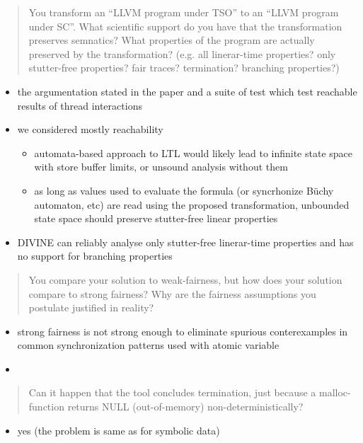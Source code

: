 \documentclass[aspectratio=169, fi]{paradise-slide}
\newcommand{\rquote}[1]{\begin{quote}#1\end{quote}\bigskip\setlength{\leftmargini}{1em}}
\begin{document}
\begin{frame}[noframenumbering]{\qtitle}
  \rquote{You transform an ``LLVM program under TSO'' to an ``LLVM program under SC''. What
  scientific support do you have that the transformation preserves semnatics? What properties of the
  program are actually preserved by the transformation? (e.g. all linerar-time properties? only
  stutter-free properties? fair traces? termination? branching properties?)}
  \begin{itemize}
    \item the argumentation stated in the paper and a suite of test which test reachable results of
      thread interactions
    \item we considered mostly reachability
      \begin{itemize}
        \item automata-based approach to LTL would likely lead to infinite state space with store
          buffer limits, or unsound analysis without them
        \item as long as values used to evaluate the formula (or syncrhonize Büchy automaton, etc)
          are read using the proposed transformation, unbounded state space should preserve
          stutter-free linear properties
      \end{itemize}
    \item DIVINE can reliably analyse only stutter-free linerar-time properties and has no support
      for branching properties
  \end{itemize}
\end{frame}

\begin{frame}[noframenumbering]{\qtitle}
  \rquote{You compare your solution to weak-fairness, but how does your solution compare to strong
    fairness? Why are the fairness assumptions you postulate justified in reality?}
  \begin{itemize}
    \item strong fairness is not strong enough to eliminate spurious conterexamples in common
      synchronization patterns used with atomic variable
    \item 
  \end{itemize}
\end{frame}

\begin{frame}[noframenumbering]{\qtitle}
  \rquote{Can it happen that the tool concludes termination, just because a malloc-function returns
    NULL (out-of-memory) non-deterministically?}
  \begin{itemize}
    \item yes (the problem is same as for symbolic data)
  \end{itemize}
\end{frame}
\end{document}
